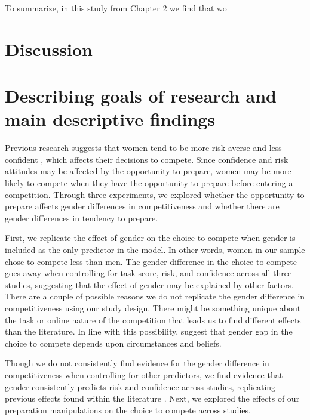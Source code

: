 \documentclass[a4paper, nobind]{templates/ociamthesis}
\begin{document}
To summarize, in this study from Chapter 2 we find that wo

\hypertarget{discussion-3}{%
\section{Discussion}\label{discussion-3}}

\hypertarget{describing-goals-of-research-and-main-descriptive-findings}{%
\section{Describing goals of research and main descriptive findings}\label{describing-goals-of-research-and-main-descriptive-findings}}

Previous research suggests that women tend to be more risk-averse \autocite{Croson2009,Dohmen2011b,Eckel2008,Bertrand2010a} and less confident \autocite{Bertrand2010,Lundeberg1994,Mobius2011,Barber2001,Croson2009}, which affects their decisions to compete. Since confidence and risk attitudes may be affected by the opportunity to prepare, women may be more likely to compete when they have the opportunity to prepare before entering a competition. Through three experiments, we explored whether the opportunity to prepare affects gender differences in competitiveness and whether there are gender differences in tendency to prepare.

First, we replicate the effect of gender on the choice to compete when gender is included as the only predictor in the model. In other words, women in our sample chose to compete less than men. The gender difference in the choice to compete goes away when controlling for task score, risk, and confidence across all three studies, suggesting that the effect of gender may be explained by other factors. There are a couple of possible reasons we do not replicate the gender difference in competitiveness using our study design. There might be something unique about the task or online nature of the competition \autocite{Apicella2020,Charness2021,Apicella2017} that leads us to find different effects than the literature. In line with this possibility, \textcite{Charness2021} suggest that gender gap in the choice to compete depends upon circumstances and beliefs.

Though we do not consistently find evidence for the gender difference in competitiveness when controlling for other predictors, we find evidence that gender consistently predicts risk and confidence across studies, replicating previous effects found within the literature \autocite{Croson2009,Dohmen2011b,Eckel2008,Bertrand2010a,Bertrand2010,Lundeberg1994,Mobius2011,Barber2001}. Next, we explored the effects of our preparation manipulations on the choice to compete across studies.
\end{document}
